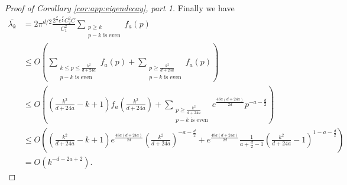 \begin{proof}[Proof of Corollary \ref{cor:app:eigendecay}, part 1]
Finally we have
\begin{align*}
\overline{\lambda_k}&= 2\pi^{d/2}\frac{2^{\frac{d}{2}}e^{\frac{d}{2}}C_2^2C}{C_1^2}\sum_{\substack{p\geq k\\p-k\text{ is even}}} f_a(p)\\
&\leq O\left(\sum_{\substack{k\leq p \leq \frac{k^2}{d+24a}\\p-k\text{ is even}}} f_a(p)+\sum_{\substack{p\geq \frac{k^2}{d+24a}\\p-k\text{ is even}}} f_a(p)\right)\\
&\leq O\left(\left(\frac{k^2}{d+24a}-k+1\right)f_a\left(\frac{k^2}{d+24a}\right)+\sum_{\substack{p\geq \frac{k^2}{d+24a}\\p-k\text{ is even}}} e^{\frac{48a(d+24a)}{2d}}p^{-a-\frac{d}{2}}\right)\\
&\leq O\left(\left(\frac{k^2}{d+24a}-k+1\right)e^{\frac{48a(d+24a)}{2d}}\left(\frac{k^2}{d+24a}\right)^{-a-\frac{d}{2}}+ e^{\frac{48a(d+24a)}{2d}}\frac{1}{{a+\frac{d}{2}-1}}\left(\frac{k^2}{d+24a}-1\right)^{1-a-\frac{d}{2}}\right)\\
&=O(k^{-d-2a+2}).
\end{align*} 


\end{proof}
